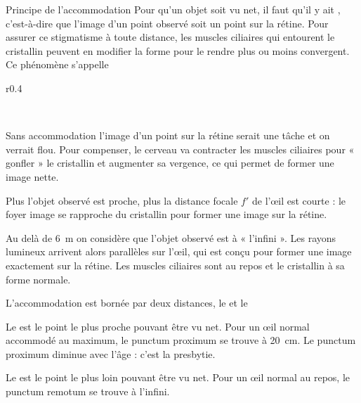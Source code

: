 \begin{doc}{Principe de l'accommodation}
  Pour qu'un objet soit vu net, il faut qu'il y ait , c'est-à-dire que l'image d'un point observé soit un point sur la rétine.
  Pour assurer ce stigmatisme à toute distance, les muscles ciliaires qui entourent le cristallin peuvent en modifier la forme pour le rendre plus ou moins convergent.
  Ce phénomène s'appelle 

  \begin{wrapfigure}[19]{r}{0.4\linewidth}
    \vspace*{-20pt}
    \centering
     \\
    
     \\
  \end{wrapfigure}

  \pointCyan {}
  
  Sans accommodation l'image d'un point sur la rétine serait une tâche et on verrait flou.
  Pour compenser, le cerveau va contracter les muscles ciliaires pour « gonfler » le cristallin et augmenter sa vergence, ce qui permet de former une image nette.

  Plus l'objet observé est proche, plus la distance focale $f'$ de l'œil est courte : le foyer image se rapproche du cristallin pour former une image sur la rétine.
  
  \pointCyan {}
  
  Au delà de \qty{6}{\m} on considère que l'objet observé est à « l'infini ».
  Les rayons lumineux arrivent alors parallèles sur l'œil, qui est conçu pour former une image exactement sur la rétine.
  Les muscles ciliaires sont au repos et le cristallin à sa forme normale.

  \pointCyan {}
  
  L'accommodation est bornée par deux distances, le  et le 
  \begin{listePoints}
    \item Le  est le point le plus proche pouvant être vu net.
    Pour un œil normal accommodé au maximum, le punctum proximum se trouve à \qty{20}{\cm}.
    Le punctum proximum diminue avec l'âge : c'est la presbytie.
  \end{listePoints}
  
  \begin{listePoints}
    \item Le  est le point le plus loin pouvant être vu net.
    Pour un œil normal au repos, le punctum remotum se trouve à l'infini.
  \end{listePoints}
\end{doc}

